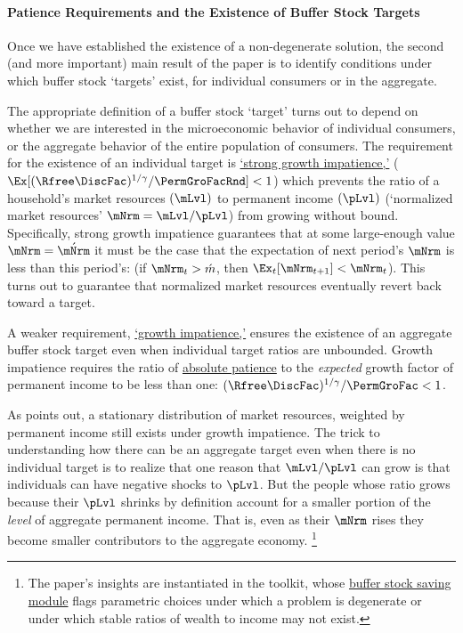 \documentclass[BufferStockTheory]{subfiles}
\begin{document}

\paragraph{Patience Requirements and the Existence of Buffer Stock Targets}

Once we have established the existence of a non-degenerate solution, the second (and more important) main result of the paper is to identify conditions under which buffer stock `targets' exist, for individual consumers or in the aggregate.

The appropriate definition of a buffer stock `target' turns out to depend on whether we are interested in the microeconomic behavior of individual consumers, or the aggregate behavior of the entire population of consumers.
The requirement for the existence of an individual target is \hyperlink{GICMod}{`strong growth impatience,'} ($\Ex[\APFacRaw/\PermGroFacRnd] < 1$) which prevents the ratio of a household's market resources $(\mLvl)$ to permanent income $(\pLvl)$ (`normalized market resources' $\mNrm = \mLvl/\pLvl$) from growing without bound.
Specifically, strong growth impatience guarantees that at some large-enough value $\mNrm = \acute{\mNrm}$ it must be the case that the expectation of next period's $\mNrm$ is less than this period's: (if $\mNrm_{t} > \acute{m}$, then $\Ex_{t}[\mNrm_{t+1}] < \mNrm_{t}$). 
This turns out to guarantee that normalized market resources eventually revert back toward a target.

A weaker requirement, \hyperlink{GICRaw}{`growth impatience,'} ensures the existence of an aggregate buffer stock target even when individual target ratios are unbounded.
Growth impatience requires the ratio of \hyperlink{APFacDefn}{absolute patience} to the \textit{expected} growth factor of permanent income to be less than one: $\APFacRaw/\PermGroFac < 1$.

As \cite{harmenbergInvariant} points out, a stationary distribution of market resources, weighted by permanent income still exists under growth impatience. 
The trick to understanding how there can be an aggregate target even when there is no individual target is to realize that one reason that $\mLvl/\pLvl$ can grow is that individuals can have negative shocks to $\pLvl$.  But the people whose ratio grows because their $\pLvl$ shrinks by definition account for a smaller portion of the \textit{level} of aggregate permanent income. That is, even as their $\mNrm$ rises they become smaller contributors to the aggregate economy.  
\footnote{The paper's insights are instantiated in the {\ARKurl} toolkit, whose \href{https://hark.readthedocs.io/en/stable/reference/ConsumptionSaving/ConsIndShockModel.html}{buffer stock saving module} flags parametric choices under which a problem is degenerate or under which stable ratios of wealth to income may not exist.}
\end{document}
